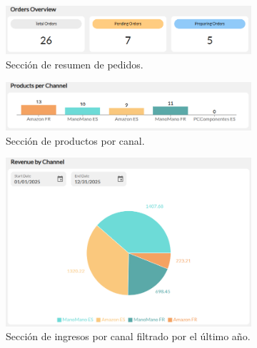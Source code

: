 \begin{figure}[H]
    \centering
    \begin{subfigure}{0.48\linewidth}
        \centering
        \includegraphics[width=\linewidth]{figures/design_develop/screenshots/dash_sec1.png}
        \caption{Sección de resumen de pedidos.}
    \end{subfigure}
    \hfill
    \begin{subfigure}{0.48\linewidth}
        \centering
        \includegraphics[width=\linewidth]{figures/design_develop/screenshots/dash_sec2.png}
        \caption{Sección de productos por canal.}
    \end{subfigure}
    \par\vspace{0.6cm}
    \begin{subfigure}{0.48\linewidth}
        \centering
        \includegraphics[width=\linewidth]{figures/design_develop/screenshots/dash_sec3.png}
        \caption{Sección de ingresos por canal filtrado por el último año.}
    \end{subfigure}
    \hfill
    \begin{subfigure}{0.48\linewidth}

\end{subfigure}
\end{figure}
